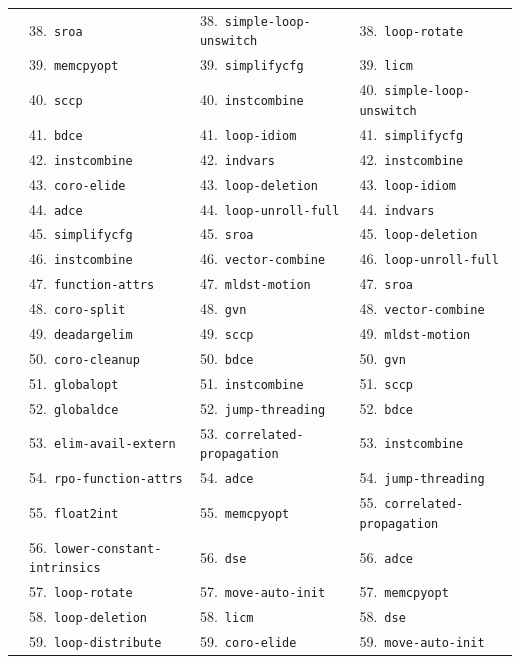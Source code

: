 \documentclass[11pt,a4paper]{article}
\begin{document}
{\begin{longtable}{llll}
 & 38.~\texttt{sroa} & 38.~\texttt{simple-loop-unswitch} & 38.~\texttt{loop-rotate} \\
 & 39.~\texttt{memcpyopt} & 39.~\texttt{simplifycfg} & 39.~\texttt{licm} \\
 & 40.~\texttt{sccp} & 40.~\texttt{instcombine} & 40.~\texttt{simple-loop-unswitch} \\
 & 41.~\texttt{bdce} & 41.~\texttt{loop-idiom} & 41.~\texttt{simplifycfg} \\
 & 42.~\texttt{instcombine} & 42.~\texttt{indvars} & 42.~\texttt{instcombine} \\
 & 43.~\texttt{coro-elide} & 43.~\texttt{loop-deletion} & 43.~\texttt{loop-idiom} \\
 & 44.~\texttt{adce} & 44.~\texttt{loop-unroll-full} & 44.~\texttt{indvars} \\
 & 45.~\texttt{simplifycfg} & 45.~\texttt{sroa} & 45.~\texttt{loop-deletion} \\
 & 46.~\texttt{instcombine} & 46.~\texttt{vector-combine} & 46.~\texttt{loop-unroll-full} \\
 & 47.~\texttt{function-attrs} & 47.~\texttt{mldst-motion} & 47.~\texttt{sroa} \\
 & 48.~\texttt{coro-split} & 48.~\texttt{gvn} & 48.~\texttt{vector-combine} \\
 & 49.~\texttt{deadargelim} & 49.~\texttt{sccp} & 49.~\texttt{mldst-motion} \\
 & 50.~\texttt{coro-cleanup} & 50.~\texttt{bdce} & 50.~\texttt{gvn} \\
 & 51.~\texttt{globalopt} & 51.~\texttt{instcombine} & 51.~\texttt{sccp} \\
 & 52.~\texttt{globaldce} & 52.~\texttt{jump-threading} & 52.~\texttt{bdce} \\
 & 53.~\texttt{elim-avail-extern} & 53.~\texttt{correlated-propagation} & 53.~\texttt{instcombine} \\
 & 54.~\texttt{rpo-function-attrs} & 54.~\texttt{adce} & 54.~\texttt{jump-threading} \\
 & 55.~\texttt{float2int} & 55.~\texttt{memcpyopt} & 55.~\texttt{correlated-propagation} \\
 & 56.~\texttt{lower-constant-intrinsics} & 56.~\texttt{dse} & 56.~\texttt{adce} \\
 & 57.~\texttt{loop-rotate} & 57.~\texttt{move-auto-init} & 57.~\texttt{memcpyopt} \\
 & 58.~\texttt{loop-deletion} & 58.~\texttt{licm} & 58.~\texttt{dse} \\
 & 59.~\texttt{loop-distribute} & 59.~\texttt{coro-elide} & 59.~\texttt{move-auto-init} \\

\end{longtable}}
\end{document}
